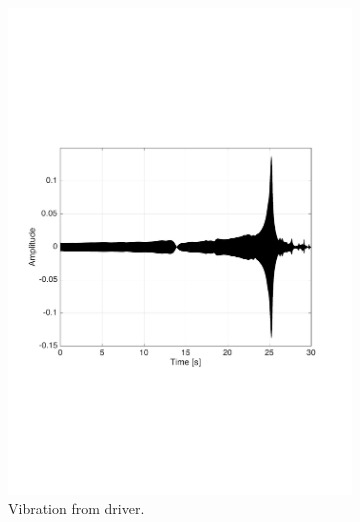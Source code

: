 \begin{figure}[H]
\centering
\begin{subfigure}[t]{0.335\textwidth}
	\includegraphics[width=1\textwidth]{figures/raw_driver10.pdf}
	\caption{Vibration from driver.}
	\label{fig:raw_driver10}
\end{subfigure}
\begin{subfigure}[t]{0.3\textwidth}

\end{subfigure}
\end{figure}
